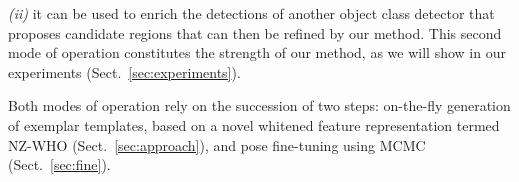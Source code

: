 {\em (ii)} it can be used to enrich the detections of another object
class detector that proposes candidate regions that can then be
refined by our method. This second mode of operation constitutes the
strength of our method, as we will show in our experiments
(Sect.~\ref{sec:experiments}).

Both modes of operation rely on the succession of two steps:
on-the-fly generation of exemplar templates, based on a novel whitened
feature representation termed NZ-WHO (Sect.~\ref{sec:approach}), and
pose fine-tuning using MCMC (Sect.~\ref{sec:fine}).




















